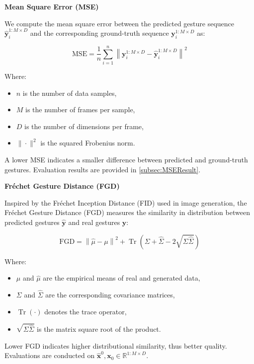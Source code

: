 \textbf{Mean Square Error (MSE)}

We compute the mean square error between the predicted gesture sequence $\hat{\mathbf{y}}_i^{1:M \times D}$ and the corresponding ground-truth sequence $\mathbf{y}_i^{1:M \times D}$ as:

\begin{equation}
	\text{MSE} = \frac{1}{n} \sum_{i=1}^n \left\| \mathbf{y}_i^{1:M \times D} - \hat{\mathbf{y}}_i^{1:M \times D} \right\|^2
\end{equation}

Where:
\begin{itemize}
	\item $n$ is the number of data samples,
	\item $M$ is the number of frames per sample,
	\item $D$ is the number of dimensions per frame,
	\item $\|\cdot\|^2$ is the squared Frobenius norm.
\end{itemize}

A lower MSE indicates a smaller difference between predicted and ground-truth gestures. Evaluation results are provided in \autoref{subsec:MSEResult}.

\textbf{Fréchet Gesture Distance (FGD)}

Inspired by the Fréchet Inception Distance (FID) used in image generation, the Fréchet Gesture Distance (FGD) measures the similarity in distribution between predicted gestures $\hat{\mathbf{y}}$ and real gestures $\mathbf{y}$:

\begin{equation}
	\text{FGD} = \left\| \hat{\mu} - \mu \right\|^2 + \operatorname{Tr}\left( \Sigma + \hat{\Sigma} - 2 \sqrt{\Sigma \hat{\Sigma}} \right)
	\label{eq:fidscore}
\end{equation}

Where:
\begin{itemize}
	\item $\mu$ and $\hat{\mu}$ are the empirical means of real and generated data,
	\item $\Sigma$ and $\hat{\Sigma}$ are the corresponding covariance matrices,
	\item $\operatorname{Tr}(\cdot)$ denotes the trace operator,
	\item $\sqrt{\Sigma \hat{\Sigma}}$ is the matrix square root of the product.
\end{itemize}

Lower FGD indicates higher distributional similarity, thus better quality. Evaluations are conducted on $\hat{\mathbf{x}}^{0}, \mathbf{x}_0 \in \mathbb{R}^{1:M \times D}$.

